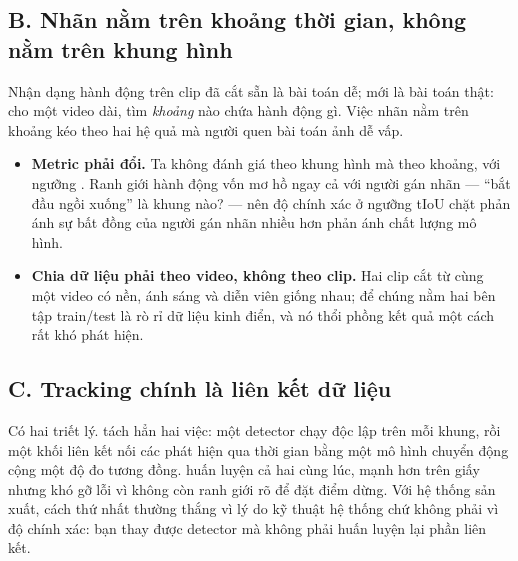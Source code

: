 \documentclass[../../../deep_learning.tex]{subfiles}
\begin{document}
\subsection{B. Nhãn nằm trên khoảng thời gian, không nằm trên khung hình}
Nhận dạng hành động trên clip đã cắt sẵn là bài toán dễ;  mới là bài toán thật: cho một video dài, tìm \emph{khoảng} nào chứa hành động gì. Việc nhãn nằm trên khoảng kéo theo hai hệ quả mà người quen bài toán ảnh dễ vấp.

\begin{itemize}
\item \textbf{Metric phải đổi.} Ta không đánh giá theo khung hình mà theo khoảng, với ngưỡng . Ranh giới hành động vốn mơ hồ ngay cả với người gán nhãn --- ``bắt đầu ngồi xuống'' là khung nào? --- nên độ chính xác ở ngưỡng tIoU chặt phản ánh sự bất đồng của người gán nhãn nhiều hơn phản ánh chất lượng mô hình.
\item \textbf{Chia dữ liệu phải theo video, không theo clip.} Hai clip cắt từ cùng một video có nền, ánh sáng và diễn viên giống nhau; để chúng nằm hai bên tập train/test là rò rỉ dữ liệu kinh điển, và nó thổi phồng kết quả một cách rất khó phát hiện. 
\end{itemize}

\subsection{C. Tracking chính là liên kết dữ liệu}
Có hai triết lý.  tách hẳn hai việc: một detector chạy độc lập trên mỗi khung, rồi một khối liên kết nối các phát hiện qua thời gian bằng một mô hình chuyển động cộng một độ đo tương đồng.  huấn luyện cả hai cùng lúc, mạnh hơn trên giấy nhưng khó gỡ lỗi vì không còn ranh giới rõ để đặt điểm dừng. Với hệ thống sản xuất, cách thứ nhất thường thắng vì lý do kỹ thuật hệ thống chứ không phải vì độ chính xác: bạn thay được detector mà không phải huấn luyện lại phần liên kết.
\end{document}
